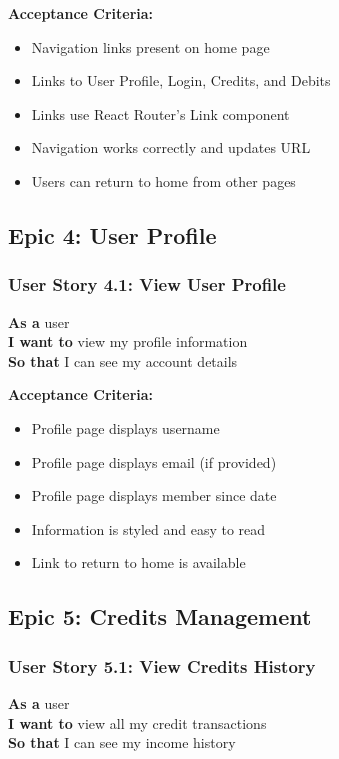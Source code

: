 \documentclass[11pt,a4paper]{article}
\begin{document}
\textbf{Acceptance Criteria:}
\begin{itemize}[leftmargin=*]
    \item Navigation links present on home page
    \item Links to User Profile, Login, Credits, and Debits
    \item Links use React Router's Link component
    \item Navigation works correctly and updates URL
    \item Users can return to home from other pages
\end{itemize}

\subsection{Epic 4: User Profile}

\subsubsection{User Story 4.1: View User Profile}
\textbf{As a} user\\
\textbf{I want to} view my profile information\\
\textbf{So that} I can see my account details

\textbf{Acceptance Criteria:}
\begin{itemize}[leftmargin=*]
    \item Profile page displays username
    \item Profile page displays email (if provided)
    \item Profile page displays member since date
    \item Information is styled and easy to read
    \item Link to return to home is available
\end{itemize}

\subsection{Epic 5: Credits Management}

\subsubsection{User Story 5.1: View Credits History}
\textbf{As a} user\\
\textbf{I want to} view all my credit transactions\\
\textbf{So that} I can see my income history
\end{document}
